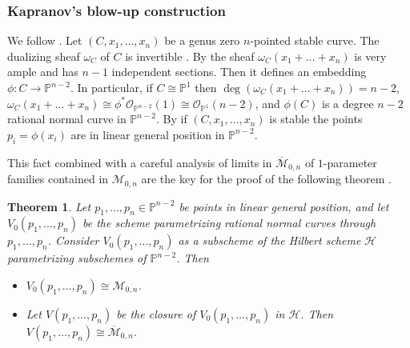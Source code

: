 \documentclass[a4paper,10pt]{amsart}
\newtheorem{thm}{Theorem}[section]
\theoremstyle{definition}
\newcommand{\cM}{\overline{\mathcal{M}}}
\begin{document}
\subsubsection*{Kapranov's blow-up construction}
We follow \cite{Ka}. Let $(C,x_{1},\dots,x_{n})$ be a genus zero $n$-pointed stable curve. The dualizing sheaf $\omega_{C}$ of $C$ is invertible \cite{Kn}. By \cite[Corollaries 1.10 and 1.11]{Kn} the sheaf $\omega_{C}(x_{1}+\dots+x_{n})$ is very ample and has $n-1$ independent sections. Then it defines an embedding $\phi:C\rightarrow\mathbb{P}^{n-2}$. In particular, if $C\cong\mathbb{P}^{1}$ then $\deg(\omega_{C}(x_{1}+\dots+x_{n})) = n-2$, $\omega_{C}(x_{1}+\dots+x_{n})\cong\phi^{*}\mathcal{O}_{\mathbb{P}^{n-2}}(1)\cong\mathcal{O}_{\mathbb{P}^{1}}(n-2)$, and $\phi(C)$ is a degree $n-2$ rational normal curve in $\mathbb{P}^{n-2}$. By \cite[Lemma 1.4]{Ka} if $(C,x_{1},\dots,x_{n})$ is stable the points $p_{i} = \phi(x_{i})$ are in linear general position in $\mathbb{P}^{n-2}$.

This fact combined with a careful analysis of limits in $\cM_{0,n}$ of $1$-parameter families contained in $\mathcal{M}_{0,n}$ are the key for the proof of the following theorem \cite[Theorem 0.1]{Ka}.

\begin{thm}\label{kaphilb}
Let $p_{1},\dots,p_{n}\in\mathbb{P}^{n-2}$ be points in linear general position, and let $V_{0}(p_{1},\dots,p_{n})$ be the scheme parametrizing rational normal curves through $p_{1},\dots,p_{n}$. Consider $V_{0}(p_{1},\dots,p_{n})$ as a subscheme of the Hilbert scheme $\mathcal{H}$ parametrizing subschemes of $\mathbb{P}^{n-2}$. Then
\begin{itemize}
\item[-] $V_{0}(p_{1},\dots,p_{n})\cong \mathcal{M}_{0,n}$.
\item[-] Let $V(p_{1},\dots,p_{n})$ be the closure of $V_{0}(p_{1},\dots,p_{n})$ in $\mathcal{H}$. Then $V(p_{1},\dots,p_{n})\cong\cM_{0,n}$. 
\end{itemize}
\end{thm}
\end{document}
